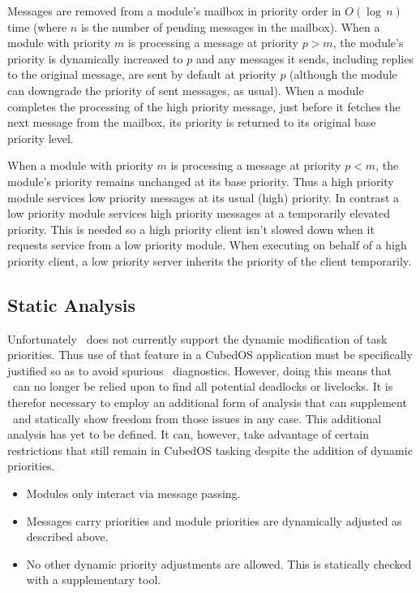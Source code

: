 Messages are removed from a module's mailbox in priority order in $O(\log\,n)$ time (where $n$
is the number of pending messages in the mailbox).  When a module with priority $m$ is processing a message at priority $p > m$, the
module's priority is dynamically increased to $p$ and any messages it sends, including replies
to the original message, are sent by default at priority $p$ (although the module can downgrade
the priority of sent messages, as usual). When a module completes the processing of the high
priority message, just before it fetches the next message from the mailbox, its priority is
returned to its original base priority level.

When a module with priority $m$ is processing a message at priority $p < m$, the module's
priority remains unchanged at its base priority.  Thus a high priority module services low priority
messages at its usual (high) priority. In contrast a low priority module services high priority
messages at a temporarily elevated priority. This  is needed so a
high priority client isn't slowed down when it requests service from a low priority module. When
executing on behalf of a high priority client, a low priority server inherits the priority of
the client temporarily.

\subsection{Static Analysis}

Unfortunately \SPARK\ does not currently support the dynamic modification of task priorities.
Thus use of that feature in a CubedOS application must be specifically justified so as to avoid
spurious \SPARK\ diagnostics. However, doing this means that \SPARK\ can no longer be relied
upon to find all potential deadlocks or livelocks. It is therefor necessary to employ an
additional form of analysis that can supplement \SPARK\ and statically show freedom from those
issues in any case. This additional analysis has yet to be defined. It can, however, take
advantage of certain restrictions that still remain in CubedOS tasking despite the addition of
dynamic priorities.

\begin{itemize}
\item Modules only interact via message passing.
\item Messages carry priorities and module priorities are dynamically adjusted as described above.
\item No other dynamic priority adjustments are allowed.  This is statically checked with a supplementary tool. 
\end{itemize}


